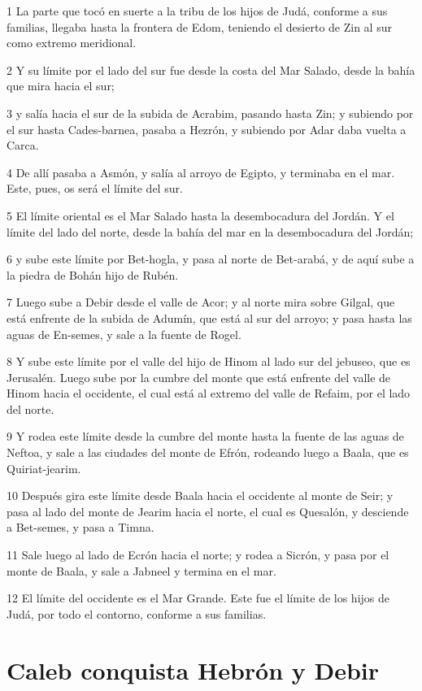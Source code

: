 \par 1 La parte que tocó en suerte a la tribu de los hijos de Judá, conforme a sus familias, llegaba hasta la frontera de Edom, teniendo el desierto de Zin al sur como extremo meridional.
\par 2 Y su límite por el lado del sur fue desde la costa del Mar Salado, desde la bahía que mira hacia el sur;
\par 3 y salía hacia el sur de la subida de Acrabim, pasando hasta Zin; y subiendo por el sur hasta Cades-barnea, pasaba a Hezrón, y subiendo por Adar daba vuelta a Carca.
\par 4 De allí pasaba a Asmón, y salía al arroyo de Egipto, y terminaba en el mar. Este, pues, os será el límite del sur.
\par 5 El límite oriental es el Mar Salado hasta la desembocadura del Jordán. Y el límite del lado del norte, desde la bahía del mar en la desembocadura del Jordán;
\par 6 y sube este límite por Bet-hogla, y pasa al norte de Bet-arabá, y de aquí sube a la piedra de Bohán hijo de Rubén.
\par 7 Luego sube a Debir desde el valle de Acor; y al norte mira sobre Gilgal, que está enfrente de la subida de Adumín, que está al sur del arroyo; y pasa hasta las aguas de En-semes, y sale a la fuente de Rogel.
\par 8 Y sube este límite por el valle del hijo de Hinom al lado sur del jebuseo, que es Jerusalén. Luego sube por la cumbre del monte que está enfrente del valle de Hinom hacia el occidente, el cual está al extremo del valle de Refaim, por el lado del norte.
\par 9 Y rodea este límite desde la cumbre del monte hasta la fuente de las aguas de Neftoa, y sale a las ciudades del monte de Efrón, rodeando luego a Baala, que es Quiriat-jearim.
\par 10 Después gira este límite desde Baala hacia el occidente al monte de Seir; y pasa al lado del monte de Jearim hacia el norte, el cual es Quesalón, y desciende a Bet-semes, y pasa a Timna.
\par 11 Sale luego al lado de Ecrón hacia el norte; y rodea a Sicrón, y pasa por el monte de Baala, y sale a Jabneel y termina en el mar.
\par 12 El límite del occidente es el Mar Grande. Este fue el límite de los hijos de Judá, por todo el contorno, conforme a sus familias.

\section*{Caleb conquista Hebrón y Debir}

